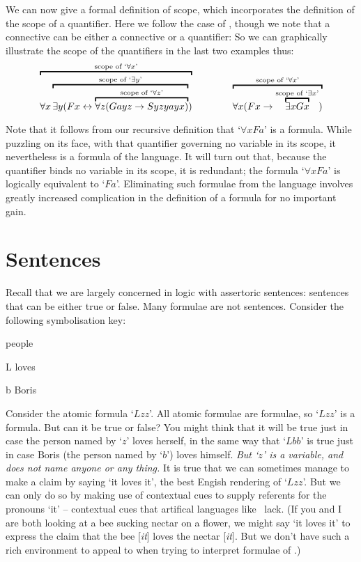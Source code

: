 We can now give a formal definition of scope, which incorporates the definition of the scope of a quantifier. Here we follow the case of \TFL, though we note that a connective can be either a connective or a quantifier:
So we can graphically illustrate the scope of the quantifiers in the last two examples thus:
	$$\overbracket{\forall x \overbracket{\exists y (Fx \eiff \overbracket{\forall z (Gayz \eif Syzyayx)}^{\text{scope of `}\forall z\text{'}}}^{\text{scope of `}\exists y\text{'}})}^{\text{scope of `}\forall x\text{'}} \qquad\qquad 
\overbracket{\forall x (Fx \eif \overbracket{\exists x Gx}^{\text{scope of `$\exists x$'}})}^{\text{scope of `$\forall x$'}}	$$

Note that it follows from our recursive definition that `$\forall x Fa$' is a formula. While puzzling on its face, with that quantifier governing no variable in its scope, it nevertheless is a formula of the language. It will turn out that, because the quantifier binds no variable in its scope, it is redundant; the formula `$\forall xFa$' is logically equivalent to `$Fa$'. Eliminating such formulae from the language involves greatly increased complication in the definition of a formula for no important gain.

\section{Sentences}
Recall that we are largely concerned in logic with assertoric sentences: sentences that can be either true or false. Many formulae are not sentences. Consider the following symbolisation key:
	\begin{ekey}
		\item[\text{domain}] people
		\item[L]  loves 
		\item[b] Boris
	\end{ekey}
Consider the atomic formula `$Lzz$'. All atomic formulae are formulae, so `$Lzz$' is a formula. But can it be true or false? You might think that it will be true just in case the person named by `$z$' loves herself, in the same way that `$Lbb$' is true just in case Boris (the person named by `$b$') loves himself. \emph{But `$z$' is a variable, and does not name anyone or any thing.} It is true that we can sometimes manage to make a claim by saying `it loves it', the best Engish rendering of `$Lzz$'. But we can only do so by making use of contextual cues to supply referents for the pronouns `it' – contextual cues that artifical languages like \FOL\ lack. (If you and I are both looking at a bee sucking nectar on a flower, we might say `it loves it' to express the claim that the bee [\emph{it}]  loves the nectar [\emph{it}]. But we don't have such a rich environment to appeal to when trying to interpret formulae of \FOL.)

